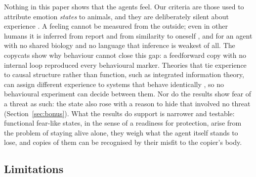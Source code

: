 \documentclass[11pt]{article}
\begin{document}
Nothing in this paper shows that the agents feel. Our criteria are those used to attribute emotion \emph{states} to animals, and they are deliberately silent about experience \cite{anderson2014framework,ledoux2012rethinking}. A feeling cannot be measured from the outside; even in other humans it is inferred from report and from similarity to oneself \cite{nagel1974bat,chalmers1995facing}, and for an agent with no shared biology and no language that inference is weakest of all. The copycats show why behaviour cannot close this gap: a feedforward copy with no internal loop reproduced every behavioural marker. Theories that tie experience to causal structure rather than function, such as integrated information theory, can assign different experience to systems that behave identically \cite{findlay2024dissociating}, so no behavioural experiment can decide between them. Nor do the results show fear of a threat as such: the state also rose with a reason to hide that involved no threat (Section~\ref{sec:bonus}). What the results do support is narrower and testable: functional fear-like states, in the sense of a readiness for protection, arise from the problem of staying alive alone, they weigh what the agent itself stands to lose, and copies of them can be recognised by their misfit to the copier's body.

\subsection{Limitations}
\end{document}

